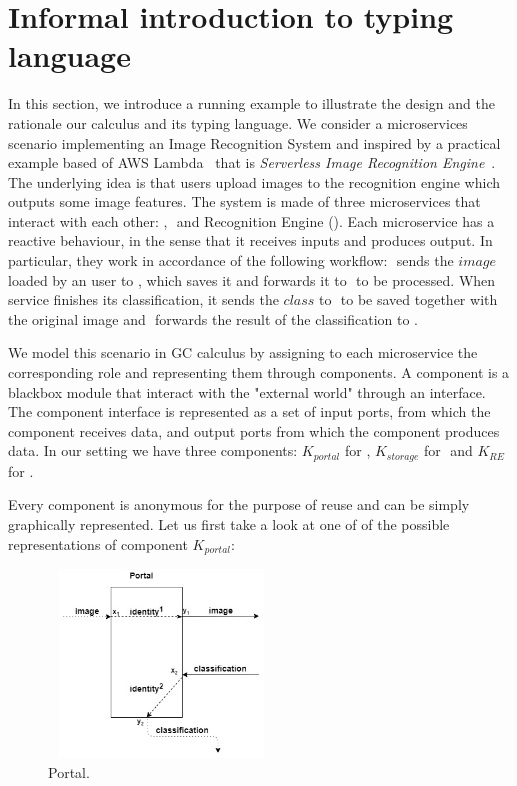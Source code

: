 
\section{Informal introduction to typing language}


In this section, we introduce a running example to illustrate the design and the rationale our calculus and its typing language. 
We consider a microservices scenario implementing an Image Recognition System and inspired by a practical example based of AWS Lambda~\cite{aws} that is \textit{Serverless Image Recognition Engine}~\cite{ire}. 
The underlying idea is that users upload images to the recognition engine which outputs some image features.
The system is made of three microservices that interact with each other: \portal, \storage $ $ and Recognition Engine (\re).
Each microservice has a reactive behaviour, in the sense that it receives inputs and produces output. In particular,
they work in accordance of the following workflow: \portal $ $ sends the $image$ loaded by an user to  \storage, which saves it and forwards it to \re $ $ to be processed. When \re $ $ service finishes its classification, it sends  the $class$ to \storage $ $ to be saved together with the original image and \storage $ $ forwards the result of the classification to \portal. 

We model this scenario in GC calculus  by assigning to each microservice the corresponding role and representing them through components. A component is a blackbox module that interact with the "external world" through an interface. The component interface is represented as a set of input ports, from which the component receives data, and output ports from which the component produces data.
In our setting we have three components:  $K_{portal}$ for \portal, $K_{storage}$ for \storage $ $ and $K_{RE}$ for \re. 





 Every component is anonymous for the purpose of reuse and can be simply graphically represented. Let us first take a look at one of of the possible representations of component $K_{portal}$:



\begin{figure}[H]

\includegraphics[width=6cm,height=5cm]{portal1.jpg}
\centering
\caption{Portal.
\label{portal1}}

\end{figure}


